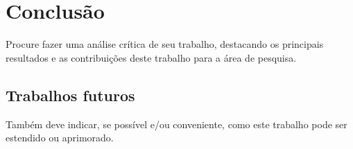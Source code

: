 
\chapter{Conclusão}
\label{chap_conclusao}

Procure fazer uma análise crítica de seu trabalho, destacando os principais resultados e as contribuições deste trabalho para a área de pesquisa.

\section{Trabalhos futuros}
\label{sec_trabalhos_futuros}

Também deve indicar, se possível e/ou conveniente, como este trabalho pode ser estendido ou aprimorado.

